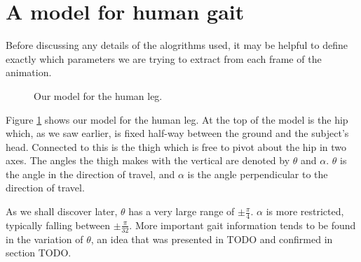 \section{A model for human gait}
\label{Design:Model}

Before discussing any details of the alogrithms used, it may be helpful to define exactly which parameters
we are trying to extract from each frame of the animation.

\begin{figure}[b]
	\centering
	\qquad
	\caption{Our model for the human leg.}
	\label{ModelImages}
\end{figure}

Figure \ref{ModelImages} shows our model for the human leg.
At the top of the model is the hip which, as we saw earlier, is fixed half-way between the ground and the subject's head.
Connected to this is the thigh which is free to pivot about the hip in two axes.
The angles the thigh makes with the vertical are denoted by $\theta$ and $\alpha$.
$\theta$ is the angle in the direction of travel, and $\alpha$ is the angle perpendicular to the direction of travel.

As we shall discover later, $\theta$ has a very large range of $\pm \frac{\pi}{4}$.
$\alpha$ is more restricted, typically falling between $\pm \frac{\pi}{32}$.
More important gait information tends to be found in the variation of $\theta$, an idea that was presented in TODO
and confirmed in section TODO.
